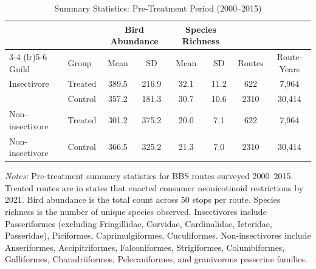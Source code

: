 \begin{table}[t]
\centering
\caption{Summary Statistics: Pre-Treatment Period (2000--2015)}
\label{tab:summary}
\begin{tabular}{llcccccc}
\toprule
 & & \multicolumn{2}{c}{Bird Abundance} & \multicolumn{2}{c}{Species Richness} & & \\
\cmidrule(lr){3-4} \cmidrule(lr){5-6}
Guild & Group & Mean & SD & Mean & SD & Routes & Route-Years \\
\midrule
Insectivore & Treated & 389.5 & 216.9 & 32.1 & 11.2 & 622 & 7,964 \\
 & Control & 357.2 & 181.3 & 30.7 & 10.6 & 2310 & 30,414 \\
\midrule
Non-insectivore & Treated & 301.2 & 375.2 & 20.0 & 7.1 & 622 & 7,964 \\
Non-insectivore & Control & 366.5 & 325.2 & 21.3 & 7.0 & 2310 & 30,414 \\
\bottomrule
\end{tabular}
\begin{tablenotes}[flushleft]
\item \textit{Notes:} Pre-treatment summary statistics for BBS routes surveyed 2000--2015. Treated routes are in states that enacted consumer neonicotinoid restrictions by 2021. Bird abundance is the total count across 50 stops per route. Species richness is the number of unique species observed. Insectivores include Passeriformes (excluding Fringillidae, Corvidae, Cardinalidae, Icteridae, Passeridae), Piciformes, Caprimulgiformes, Cuculiformes. Non-insectivores include Anseriformes, Accipitriformes, Falconiformes, Strigiformes, Columbiformes, Galliformes, Charadriiformes, Pelecaniformes, and granivorous passerine families.
\end{tablenotes}
\end{table}
